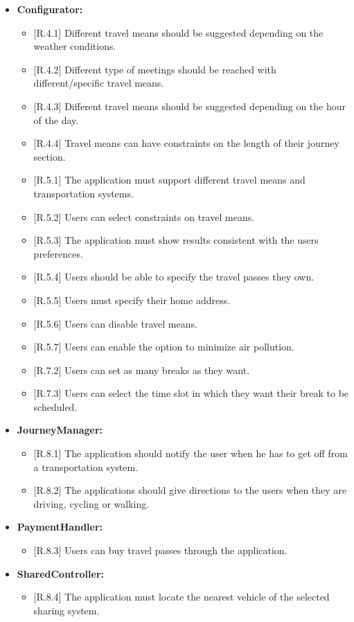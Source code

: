 \begin{itemize}
\item
\textbf{Configurator:}
\begin{itemize}
\item
$[$R.4.1$]$ Different travel means should be suggested depending on the weather conditions.
\item
$[$R.4.2$]$ Different type of meetings should be reached with different/specific travel means.
\item
$[$R.4.3$]$ Different travel means should be suggested depending on the hour of the day.
\item
$[$R.4.4$]$ Travel means can have constraints on the length of their journey section.
\item
$[$R.5.1$]$ The application must support different travel means and transportation systems.
\item
$[$R.5.2$]$ Users can select constraints on travel means.
\item
$[$R.5.3$]$ The application must show results consistent with the users preferences.
\item
$[$R.5.4$]$ Users should be able to specify the travel passes they own.
\item
$[$R.5.5$]$ Users must specify their home address.
\item
$[$R.5.6$]$ Users can disable travel means.
\item
$[$R.5.7$]$ Users can enable the option to minimize air pollution.
\item
$[$R.7.2$]$ Users can set as many breaks as they want.
\item
$[$R.7.3$]$ Users can select the time slot in which they want their break to be scheduled.
\end{itemize}

\item
\textbf{JourneyManager:}
\begin{itemize}
\item
$[$R.8.1$]$ The application should notify the user when he has to get off from a transportation system.
\item
$[$R.8.2$]$ The applications should give directions to the users when they are driving, cycling or walking.
\end{itemize}

\item
\textbf{PaymentHandler:}
\begin{itemize}
\item
$[$R.8.3$]$ Users can buy travel passes through the application.
\end{itemize}

\item
\textbf{SharedController:}
\begin{itemize}
\item
$[$R.8.4$]$ The application must locate the nearest vehicle of the selected sharing system.
\end{itemize}
\end{itemize}